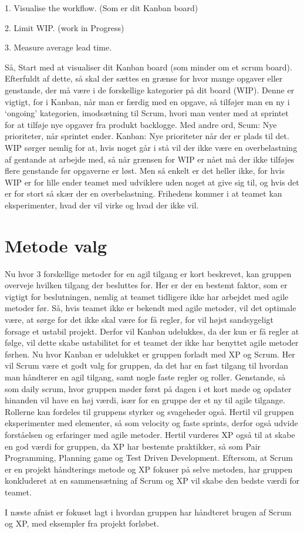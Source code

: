1. Visualise the workflow. (Som er dit Kanban board)

2. Limit WIP. (work in Progress)

3. Measure average lead time.

Så, Start med at visualiser dit Kanban board (som minder om et scrum board). Efterfuldt af dette, så skal der sættes en grænse for hvor mange opgaver eller genstande, der må være i de forskellige kategorier på dit board (WIP). Denne er vigtigt, for i Kanban, når man er færdig med en opgave, så tilføjer man en ny i ‘ongoing’ kategorien, imodsætning til Scrum, hvori man venter med at sprintet for at tilføje nye opgaver fra produkt backlogge. Med andre ord, Scum: Nye prioriteter, når sprintet ender. Kanban: Nye prioriteter når der er plads til det.\cite{SlideKanban} WIP sørger nemlig for at, hvis noget går i stå vil der ikke være en overbelastning af gentande at arbejde med, så når grænsen for WIP er nået må der ikke tilføjes flere genstande før opgaverne er løst. Men så enkelt er det heller ikke, for hvis WIP er for lille ender teamet med udviklere uden noget at give sig til, og hvis det er for stort så skær der en overbelastning. Frihedens kommer i at teamet kan eksperimenter, hvad der vil virke og hvad der ikke vil. 


\section{Metode valg}


Nu hvor 3 forskellige metoder for en agil tilgang er kort beskrevet, kan gruppen overveje hvilken tilgang der besluttes for. Her er der en bestemt faktor, som er vigtigt for beslutningen, nemlig at teamet tidligere ikke har arbejdet med agile metoder før. Så, hvis teamet ikke er bekendt med agile metoder, vil det optimale være, at sørge for det ikke skal være for få regler, for vil højst sandsygeligt forsage et ustabil projekt. Derfor vil Kanban udelukkes, da der kun er få regler at følge, vil dette skabe ustabilitet for et teamet der ikke har benyttet agile metoder førhen. Nu hvor Kanban er udelukket er gruppen forladt med XP og Scrum. Her vil Scrum være et godt valg for gruppen, da det har en fast tilgang til hvordan man håndterer en agil tilgang, samt nogle faste regler og roller. Genstande, så som daily scrum, hvor gruppen møder først på dagen i et kort møde og opdater hinanden vil have en høj værdi, især for en gruppe der et ny til agile tilgange. Rollerne kan fordeles til gruppens styrker og svageheder også. Hertil vil gruppen eksperimenter med elementer, så som velocity og faste sprints, derfor også udvide forståelsen og erfaringer med agile metoder. Hertil vurderes XP også til at skabe en god værdi for gruppen, da XP har bestemte praktikker, så som Pair Programming, Planning game og Test Driven Development. Eftersom, at Scrum er en projekt håndterings metode og XP fokuser på selve metoden, har gruppen konkluderet at en sammensætning af Scrum og XP vil skabe den bedste værdi for teamet. 

I næste afnist er fokuset lagt i hvordan gruppen har håndteret brugen af Scrum og XP, med eksempler fra projekt forløbet. 

